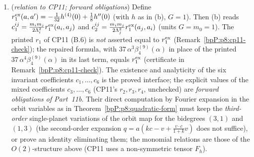\begin{proposition}
\begin{enumerate}[label=(\alph*)]
\item (\emph{relation to CP11; forward obligations}) Define $r_1^{\rm ex}(a,a')=-\tfrac1{32}h^{(4)}(0)+\tfrac18h''(0)$ (with $h$ as in (b), $G=1$). Then (b) reads $c_1^{ij}=\tfrac{m_im_j}{2\Lambda_i^2}r_1^{\rm ex}(a_i,a_j)$ and $c_2^{ij}=\tfrac{m_im_j}{2\Lambda_j^2}r_1^{\rm ex}(a_j,a_i)$ (units $G=m_0=1$). The printed $r_1$ of CP11 (B.6) is \emph{not} asserted equal to $r_1^{\rm ex}$ (Remark~\ref{bpP:p8:cp11-check}); the repaired formula, with $37\,\alpha^3\beta_4^{(9)}(\alpha)$ in place of the printed $37\,\alpha^4\beta_4^{(9)}(\alpha)$ in its last term, equals $r_1^{\rm ex}$ (certificate in Remark~\ref{bpP:p8:cp11-check}). The existence and analyticity of the six invariant coefficients $c_1,\dots,c_6$ is the proved interface; the explicit values of the mixed coefficients $c_3,\dots,c_6$ (CP11's $r_2,r_3,r_4$, unchecked) are \emph{forward obligations of Part~11b}. Their direct computation by Fourier expansion in the orbit variables as in Theorem~\ref{bpP:p8:quadratic-form} must keep the \emph{third-order} single-planet variations of the orbit map for the bidegrees $(3,1)$ and $(1,3)$ (the second-order expansion $q=a(kc-v+\frac{v\cdot c}{1+k}v)$ does not suffice), or prove an identity eliminating them; the monomial relations are those of the $O(2)$-structure above (CP11 uses a non-symmetric tensor $F_h$).
\end{enumerate}
\end{proposition}
